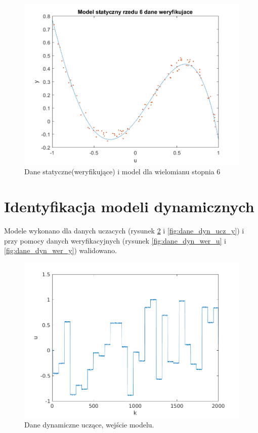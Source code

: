 \documentclass{article}
\begin{document}
\begin{figure}
\centering
\includegraphics[width=0.95\linewidth]{../dane_statyczne/dane_statyczne_model_rzedu_6_weryf}
\caption{Dane statyczne(weryfikujące) i model dla wielomianu stopnia 6}
\label{fig:danestatyczneweryf6}
\end{figure}
\section{Identyfikacja modeli dynamicznych}
Modele wykonano dla danych uczacych (rysunek \ref{fig:dane_dyn_ucz_u} i \ref{fig:dane_dyn_ucz_y}) i przy pomocy danych weryfikacyjnych (rysunek \ref{fig:dane_dyn_wer_u} i \ref{fig:dane_dyn_wer_y}) walidowano. 

\begin{figure}
\centering
\includegraphics[width=0.7\linewidth]{../dane_dynamiczne/dane_dyn_ucz_u}
\caption{Dane dynamiczne uczące, wejście modelu.}
\label{fig:dane_dyn_ucz_u}
\end{figure}
\end{document}
